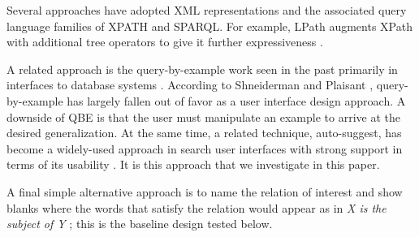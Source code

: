 Several approaches have adopted XML representations and the associated query language families of XPATH and SPARQL. For example, LPath augments XPath with additional tree operators to give it further expressiveness \cite{lai2010querying}.

A related approach is the query-by-example work seen in the past primarily in interfaces to database systems \cite{androutsopoulos1995natural}.
According to Shneiderman and Plaisant \cite{shneiderman2010designing}, query-by-example has largely fallen out of favor as a user interface design approach.  A downside of QBE is that the user must manipulate an example to arrive at the desired generalization.  At the same time, a related technique, auto-suggest, has become a widely-used approach in search user interfaces with strong support in terms of its usability \cite{hearst2009search}.   It is this approach that we investigate in this paper.

A final simple alternative approach is to name the relation of interest and show blanks where the words that satisfy the relation would appear as in \emph{X is the subject of Y} \cite{muralidharan2013supporting}; this is the baseline design tested below.
